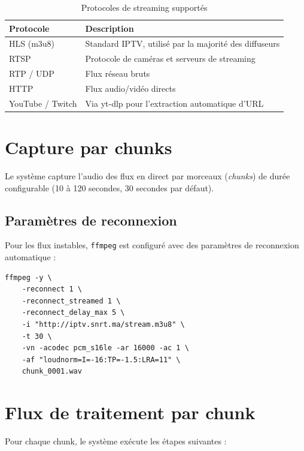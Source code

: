 \documentclass[12pt,a4paper]{report}
\begin{document}
\begin{table}[H]
    \centering
    \caption{Protocoles de streaming supportés}
    \label{tab:protocols}
    \begin{tabular}{@{} l p{8cm} @{}}
        \toprule
        \textbf{Protocole} & \textbf{Description} \\
        \midrule
        HLS (m3u8) & Standard IPTV, utilisé par la majorité des diffuseurs \\
        RTSP & Protocole de caméras et serveurs de streaming \\
        RTP / UDP & Flux réseau bruts \\
        HTTP & Flux audio/vidéo directs \\
        YouTube / Twitch & Via yt-dlp pour l'extraction automatique d'URL \\
        \bottomrule
    \end{tabular}
\end{table}

\section{Capture par chunks}

Le système capture l'audio des flux en direct par morceaux (\textit{chunks}) de durée configurable (10 à 120 secondes, 30 secondes par défaut).

\subsection{Paramètres de reconnexion}

Pour les flux instables, \texttt{ffmpeg} est configuré avec des paramètres de reconnexion automatique :

\begin{lstlisting}[style=bash, title=Paramètres ffmpeg pour la capture de flux]
ffmpeg -y \
    -reconnect 1 \
    -reconnect_streamed 1 \
    -reconnect_delay_max 5 \
    -i "http://iptv.snrt.ma/stream.m3u8" \
    -t 30 \
    -vn -acodec pcm_s16le -ar 16000 -ac 1 \
    -af "loudnorm=I=-16:TP=-1.5:LRA=11" \
    chunk_0001.wav
\end{lstlisting}

\section{Flux de traitement par chunk}

Pour chaque chunk, le système exécute les étapes suivantes :
\end{document}
